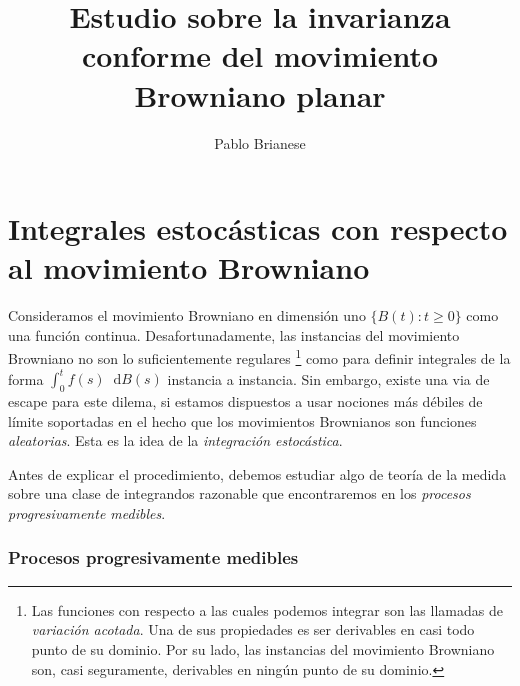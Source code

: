 \documentclass{report}
\title{Estudio sobre la invarianza conforme del movimiento Browniano planar}
\author{Pablo Brianese}
\newcommand{\brownian}{B}
\newcommand{\dd}{\mathop{}\!\mathrm{d}}
\theoremstyle{plain}
\theoremstyle{remark}
\theoremstyle{definition}
\begin{document}
\maketitle


\part{Integrales estocásticas con respecto al movimiento Browniano}

Consideramos el movimiento Browniano en dimensión uno \(\{\brownian(t) : t \geq 0\}\) como una función continua.
Desafortunadamente, las instancias del movimiento Browniano no son lo suficientemente regulares
\footnote{Las funciones con respecto a las cuales podemos integrar son las llamadas de \emph{variación acotada}.
Una de sus propiedades es ser derivables en casi todo punto de su dominio.
Por su lado, las instancias del movimiento Browniano son, casi seguramente, derivables en ningún punto de su dominio.}
como para definir integrales de la forma \(\int_0^t f(s) \dd \brownian(s)\) instancia a instancia.
Sin embargo, existe una via de escape para este dilema, si estamos dispuestos a usar nociones más débiles de límite soportadas en el hecho que los movimientos Brownianos son funciones \emph{aleatorias}.
Esta es la idea de la \emph{integración estocástica}.

Antes de explicar el procedimiento, debemos estudiar algo de teoría de la medida sobre una clase de integrandos razonable que encontraremos en los \emph{procesos progresivamente medibles}.

\section{Procesos progresivamente medibles}

\end{document}
